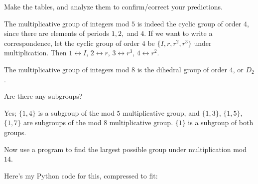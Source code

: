 \documentclass[../key.tex]{subfiles}
\begin{document}
\begin{inner_problem}
\item Make the tables, and analyze them to confirm/correct your predictions.
\end{inner_problem}

The multiplicative group of integers mod $5$ is indeed the cyclic group of order $4$, since there are elements of periods $1,2,$ and $4$. If we want to write a correspondence, let the cyclic group of order $4$ be $\{I,r,r^2,r^3\}$ under multiplication. Then $1\leftrightarrow I$, $2\leftrightarrow r$, $3\leftrightarrow r^3$, $4\leftrightarrow r^2$.

The multiplicative group of integers mod $8$ is the dihedral group of order $4$, or $D_2$.

\begin{inner_problem}
\item Are there any subgroups?
\end{inner_problem}

Yes; $\{1,4\}$ is a subgroup of the mod $5$ multiplicative group, and $\{1,3\}$, $\{1,5\}$, $\{1,7\}$ are subgroups of the mod $8$ multiplicative group. $\{1\}$ is a subgroup of both groups.

\begin{outer_problem}
\item Now use a program to find the largest possible group under multiplication mod $14$.
\end{outer_problem}

Here's my Python code for this, compressed to fit:
\end{document}

